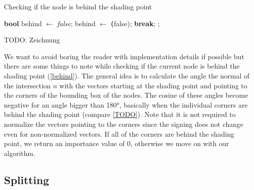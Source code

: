 \begin{algorithm}
	\caption{Checking if the node is behind the shading point}
	\label{alg:behind}
	\begin{algorithmic}[1] %
		\State \textbf{bool} behind $\gets$ \textit{false};
		\State behind $\gets$ \textbf(false);
		\State \textbf{break};
		\EndIf
		\EndFor
		\State {};
		\EndIf
		\EndIf
	\end{algorithmic}
\end{algorithm}

TODO: Zeichnung

We want to avoid boring the reader with implementation details if possible but there are some things to note while checking if the current node is behind the shading point (\ref{behind}). The general idea is to calculate the angle the normal of the intersection $n$ with the vectors starting at the shading point and pointing to the corners of the bounding box of the nodes. The cosine of these angles become negative for an angle bigger than 180°, basically when the individual corners are behind the shading point (compare \ref{TODO}). Note that it is not required to normalize the vectors pointing to the corners since the signing does not change even for non-normalized vectors. If all of the corners are behind the shading point, we return an importance value of 0, otherwise we move on with our algorithm.


\subsection{Splitting}
\label{subs:split}